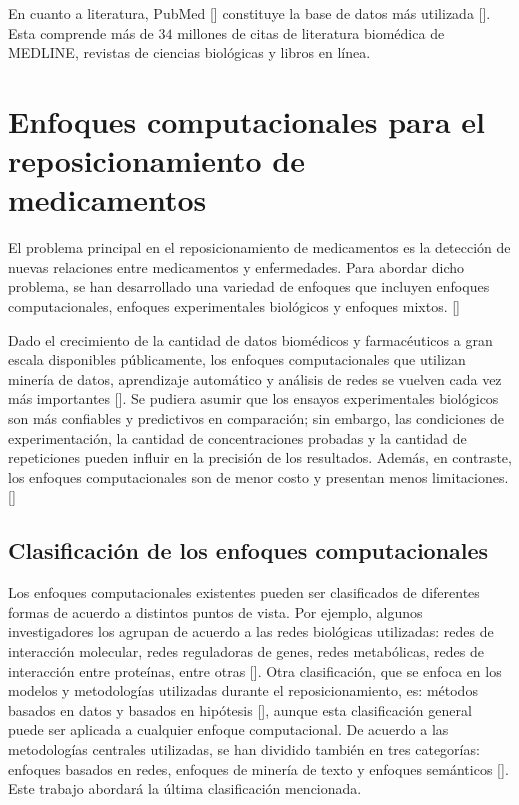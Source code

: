 En cuanto a literatura, PubMed [\cite{pubmed}] constituye la base de datos más utilizada [\cite{xue}]. Esta comprende más de $34$ millones de citas de literatura biomédica de MEDLINE, revistas de ciencias biológicas y libros en línea.

\section{Enfoques computacionales para el reposicionamiento de medicamentos}

El problema principal en el reposicionamiento de medicamentos es la detección de nuevas relaciones entre medicamentos y enfermedades. Para abordar dicho problema, se han desarrollado una variedad de enfoques que incluyen enfoques computacionales, enfoques experimentales biológicos y enfoques mixtos. [\cite{xue}]

Dado el crecimiento de la cantidad de datos biomédicos y farmacéuticos a gran escala disponibles públicamente, los enfoques computacionales que utilizan minería de datos, aprendizaje automático y análisis de redes se vuelven cada vez más importantes [\cite{jarada}]. Se pudiera asumir que los ensayos experimentales biológicos son más confiables y predictivos en comparación; sin embargo, las condiciones de experimentación, la cantidad de concentraciones probadas y la cantidad de repeticiones pueden influir en la precisión de los resultados. Además, en contraste, los enfoques computacionales son de menor costo y presentan menos limitaciones. [\cite{oprea}]

\subsection{Clasificación de los enfoques computacionales}
Los enfoques computacionales existentes pueden ser clasificados de diferentes formas de acuerdo a distintos puntos de vista. Por ejemplo, algunos investigadores los agrupan de acuerdo a las redes biológicas utilizadas: redes de interacción molecular, redes reguladoras de genes, redes metabólicas, redes de interacción entre proteínas, entre otras [\cite{lotfi}]. Otra clasificación, que se enfoca en los modelos y metodologías utilizadas durante el reposicionamiento, es: métodos basados en datos y basados en hipótesis [\cite{zou}], aunque esta clasificación general puede ser aplicada a cualquier enfoque computacional. De acuerdo a las metodologías centrales utilizadas, se han dividido también en tres categorías: enfoques basados en redes, enfoques de minería de texto y enfoques semánticos [\cite{koromina}]. Este trabajo abordará la última clasificación mencionada.

